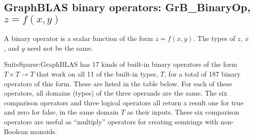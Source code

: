 \documentclass[12pt]{article}
\begin{document}
\newpage
\subsection{GraphBLAS binary operators: {\sf GrB\_BinaryOp}, $z=f(x,y)$} %
\label{binaryop}

A binary operator is a scalar function of the form $z=f(x,y)$.  The types of
$z$, $x$, and $y$ need not be the same.

SuiteSparse:GraphBLAS has 17 kinds of built-in binary operators of the form $T
\times T \rightarrow T$ that work on all 11 of the built-in types, $T$, for a
total of 187 binary operators of this form.  These are listed in the table
below.  For each of these operators, all domains (types) of the three operands
are the same.  The six comparison operators and three logical operators all
return a result one for true and zero for false, in the same domain $T$ as
their inputs.  These six comparison operators are useful as ``multiply''
operators for creating semirings with non-Boolean monoids.
\end{document}
